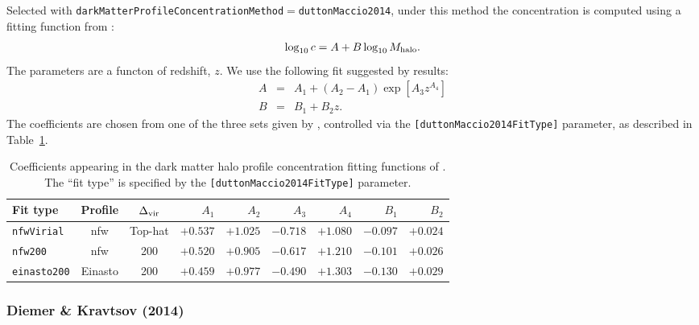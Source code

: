 Selected with {\tt darkMatterProfileConcentrationMethod}$=${\tt duttonMaccio2014}, under this method the concentration is computed using a fitting function from \cite{dutton_cold_2014}:
\begin{equation}
\log_{10} c = A + B \log_{10} M_{\rm halo}.
\end{equation}
The parameters are a functon of redshift, $z$. We use the following fit suggested by \cite{dutton_cold_2014} results:
\begin{eqnarray}
A &=& A_1+(A_2-A_1)\exp[A_3 z^{A_4}] \nonumber \\
B &=& B_1+B_2 z.
\end{eqnarray}
The coefficients are chosen from one of the three sets given by \cite{dutton_cold_2014}, controlled via the {\tt [duttonMaccio2014FitType]} parameter, as described in Table~\ref{tb:DuttonMaccioConcentrationCoefficients}.

\begin{table}
\begin{center}
\begin{tabular}{lccrrrrrr}
\hline
{\bf Fit type} & {\bf Profile} & {\boldmath $\Delta_{\rm vir}$ } & {\boldmath $A_1$} & {\boldmath $A_2$} & {\boldmath $A_3$} & {\boldmath $A_4$} & {\boldmath $B_1$} & {\boldmath $B_2$} \\
\hline
{\tt nfwVirial}  & \gls{nfw} & Top-hat & $+0.537$ & $+1.025$ & $-0.718$ & $+1.080$ & $-0.097$ & $+0.024$ \\
{\tt nfw200}     & \gls{nfw} & 200     & $+0.520$ & $+0.905$ & $-0.617$ & $+1.210$ & $-0.101$ & $+0.026$ \\
{\tt einasto200} & Einasto   & 200     & $+0.459$ & $+0.977$ & $-0.490$ & $+1.303$ & $-0.130$ & $+0.029$ \\
\hline
\end{tabular}
\end{center}
\caption{Coefficients appearing in the dark matter halo profile concentration fitting functions of \protect\cite{dutton_cold_2014}. The ``fit type'' is specified by the {\tt [duttonMaccio2014FitType]} parameter.}
\label{tb:DuttonMaccioConcentrationCoefficients}
\end{table}

\subsubsection{Diemer \& Kravtsov (2014)}\label{phys:darkMatterProfileConcentration:darkMatterProfileConcentrationDiemerKravtsov2014}

